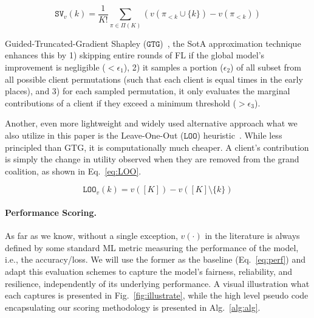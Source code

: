 \documentclass{uai2026}
\begin{document}
\begin{equation}
    \label{eq:GTG}
    \mathtt{SV}_v(k) = \frac{1}{K!} \sum_{\pi \in \Pi(K)} \left( v(\pi_{<k} \cup \{k\}) - v(\pi_{<k}) \right)
\end{equation}


Guided-Truncated-Gradient Shapley ($\mathtt{GTG}$)~\cite{liu2022gtg}, the SotA approximation technique enhances this by 1) skipping entire rounds of FL if the global model's improvement is negligible ($<\epsilon_1$), 2) it samples a portion ($\epsilon_2$) of all subset from all possible client permutations (such that each client is equal times in the early places), and 3) for each sampled permutation, it only evaluates the marginal contributions of a client if they exceed a minimum threshold ($>\epsilon_3$).

Another, even more lightweight and widely used alternative approach what we also utilize in this paper is the Leave-One-Out ($\mathtt{LOO}$) heuristic~\cite{evgeniou2004leave}. While less principled than GTG, it is computationally much cheaper. A client's contribution is simply the change in utility observed when they are removed from the grand coalition, as shown in Eq.~\eqref{eq:LOO}.

\begin{equation}
    \label{eq:LOO}
    \mathtt{LOO}_v(k) = v([K]) - v([K]\setminus\{k\})
\end{equation}

\paragraph{Performance Scoring. }

As far as we know, without a single exception, $v(\cdot)$ in the literature is always defined by some standard ML metric measuring the performance of the model, i.e., the accuracy/loss. We will use the former as the baseline (Eq.~\eqref{eq:perf}) and adapt this evaluation schemes to capture the model's fairness, reliability, and resilience, independently of its underlying performance. A visual illustration what each captures is presented in Fig.~\ref{fig:illustrate}, while the high level pseudo code encapsulating our scoring methodology is presented in Alg.~\ref{alg:alg}.
\end{document}
